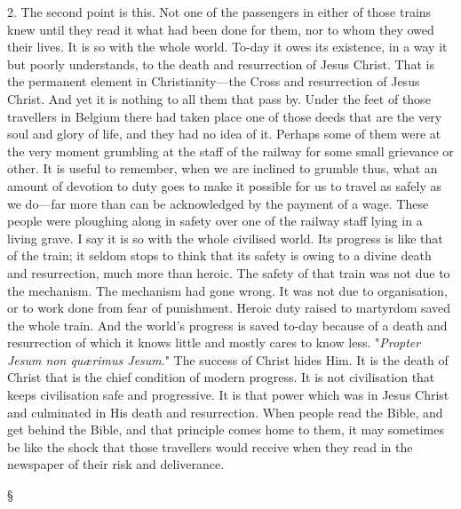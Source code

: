 \documentclass[12pt,letterpaper,oneside]{book}
\begin{document}
2. The second point is this. Not one of the 
passengers in either of those trains knew until 
they read it what had been done for them, nor 
to whom they owed their lives. It is so with 
the whole world. To-day it owes its existence, 
in a way it but poorly understands, to the 
death and resurrection of Jesus Christ. That 
is the permanent element in Christianity---the 
Cross and resurrection of Jesus Christ. And 
yet it is nothing to all them that pass by. 
Under the feet of those travellers in Belgium 
there had taken place one of those deeds that 
are the very soul and glory of life, and they had 
no idea of it. Perhaps some of them were at 
the very moment grumbling at the staff of the 
railway for some small grievance or other. It 
is useful to remember, when we are inclined to 
grumble thus, what an amount of devotion to 
duty goes to make it possible for us to travel as 
safely as we do---far more than can be acknowledged 
by the payment of a wage. These 
people were ploughing along in safety over one 
of the railway staff lying in a living grave. I 
say it is so with the whole civilised world. Its 
progress is like that of the train; it seldom 
stops to think that its safety is owing to a 
divine death and resurrection, much more than 
heroic. The safety of that train was not due 
to the mechanism. The mechanism had gone 
wrong. It was not due to organisation, or to 
work done from fear of punishment. Heroic 
duty raised to martyrdom saved the whole 
train. And the world's progress is saved to-day 
because of a death and resurrection of which
it knows little and mostly cares to know less. 
"\textit{Propter Jesum non qu{\ae}rimus Jesum}." The 
success of Christ hides Him. It is the death 
of Christ that is the chief condition of modern 
progress. It is not civilisation that keeps 
civilisation safe and progressive. It is that 
power which was in Jesus Christ and culminated 
in His death and resurrection. When 
people read the Bible, and get behind the 
Bible, and that principle comes home to them, 
it may sometimes be like the shock that those 
travellers would receive when they read in the 
newspaper of their risk and deliverance. 

\begin{center} \S \end{center}
\end{document}
